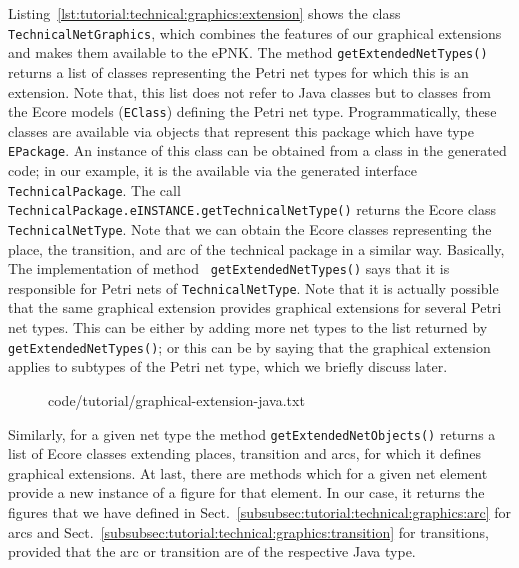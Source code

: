 {\sloppy
Listing~\ref{lst:tutorial:technical:graphics:extension} shows
the class {\tt Technical\optsep{}Net\optsep{}Graphics}, which combines the
features of our graphical extensions and makes them available to the ePNK.
The method {\tt getExtendedNetTypes()} returns a list of classes representing
the Petri net types for which this is an extension. Note that, this list does
not refer to
Java classes but to classes from the Ecore models ({\tt EClass}) defining the
Petri net type. Programmatically, these classes are available via objects that
represent this package which have type {\tt EPackage}. An instance of this
class can be obtained from a class in the generated code; in our example,
it is the available via the generated interface {\tt TechnicalPackage}. The
call  {\tt
TechnicalPackage.eINSTANCE.get\optsep{}Technical\optsep{}Net\optsep{}Type()}
returns the Ecore class {\tt TechnicalNetType}. Note that we can obtain the
Ecore classes representing the place, the transition, and arc of the technical
package in a similar way. Basically, The implementation of method {\tt
getExtended\optsep{}Net\optsep{}Types()} says that it is responsible for Petri
nets of {\tt Technical\optsep{}Net\optsep{}Type}. Note that it is actually
possible that the same graphical extension provides graphical extensions for several 
Petri net types. This can be either by adding more net
types to the list returned by {\tt getExtendedNet\optsep{}Types()}; or this can
be by saying that the graphical extension applies to subtypes of the Petri net type,
which we briefly discuss later.
}

\begin{figure}[htbp!]
%
  {code/tutorial/graphical-extension-java.txt}
\end{figure}

Similarly, for a given net type the method {\tt getExtendedNetObjects()} 
returns a list of Ecore classes extending places, transition and arcs, for which
it defines graphical extensions. At last, there are methods which for a given
net element provide a new instance of a figure for that element. In our case,
it returns the figures that we have defined in
Sect.~\ref{subsubsec:tutorial:technical:graphics:arc} for arcs and
Sect.~\ref{subsubsec:tutorial:technical:graphics:transition} for transitions,
provided that the arc or transition are of the respective Java type.\\

